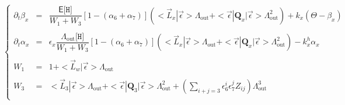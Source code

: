 \documentclass[aps,onecolumn,11pt]{revtex4}
\newcommand{\mychem}[1]{\mathtt{#1}}
\newcommand{\myconc}[1]{\big[#1\big]}
\newcommand{\spproton}{\mychem{H}}
\newcommand{\proton}{\myconc{\spproton}}
\newcommand{\myout}[1]{{#1}_{\mathrm{out}}}
\newcommand{\mymat}[1]{{\bm{#1}}}
\newcommand{\LiAll}{\Lambda}
\newcommand{\LiAllOut}{\myout{\LiAll}}
\begin{document}
\begin{equation}
\left\lbrace
\begin{array}{rcl}
	\partial_t \beta_x & = & 
	\dfrac{\mathsf{E}\proton}{W_1+W_3} \left[1-(\alpha_{6}+\alpha_{7})\right] \left( <\vec{L}_x|\vec{\epsilon}> \LiAllOut + <\vec{\epsilon}|\mymat{Q}_x|\vec{\epsilon}>\LiAllOut^2\right) 
	+ k_x \left(\Theta - \beta_x\right)\\
	\\
	\partial_t \alpha_{x} & = &  \epsilon_x  \dfrac{\LiAllOut \proton}{W_1+W_3} \left[1-(\alpha_{6}+\alpha_{7})\right] \left( <\vec{L}_x|\vec{\epsilon}> \LiAllOut + <\vec{\epsilon}|\mymat{Q}_x|\vec{\epsilon}>\LiAllOut^2\right) 
	- k_x^h \alpha_{x}
	\\
	\\
	W_1 & = & 1 +  <\vec{L}_w | \vec{\epsilon}> \LiAllOut \\
	\\
	W_3 & = & \displaystyle <\vec{L}_3|\vec{\epsilon}> \LiAllOut + <\vec{\epsilon}|\mymat{Q}_3|\vec{\epsilon}> \LiAllOut^2+ \left(\sum_{i+j=3}\epsilon_6^i \epsilon_7^j Z_{ij}\right) \LiAllOut^3 \\
\end{array}
\right.
\end{equation}
\end{document}

